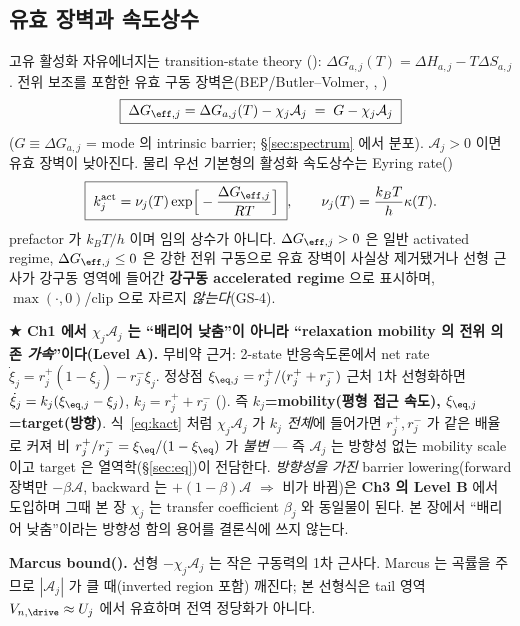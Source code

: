 \subsection{유효 장벽과 속도상수}
고유 활성화 자유에너지는 transition-state theory \cite{eyring1935,evanspolanyi1938}():
$\Delta G_{a,j}(T)=\Delta H_{a,j}-T\Delta S_{a,j}$. 전위 보조를 포함한 유효 구동 장벽은(BEP/Butler--Volmer,
, \cite{evanspolanyi1938,bardfaulkner})
\begin{equation}
\boxed{\;\Delta G_{\eff,j}=\Delta G_{a,j}(T)-\chi_j\mathcal A_j\;=\;G-\chi_j\mathcal A_j\;}
\label{eq:Geff}
\end{equation}
($G\equiv\Delta G_{a,j}$ = mode 의 intrinsic barrier; \S\ref{sec:spectrum} 에서 분포). $\mathcal A_j>0$
이면 유효 장벽이 낮아진다. 물리 우선 기본형의 활성화 속도상수는 Eyring rate()
\begin{equation}
\boxed{\;k_j^\mathrm{act}=\nu_j(T)\exp\!\Big[-\frac{\Delta G_{\eff,j}}{RT}\Big]\;},\qquad
\nu_j(T)=\frac{k_BT}{h}\kappa(T).
\label{eq:kact}
\end{equation}
prefactor 가 $k_BT/h$ 이며 임의 상수가 아니다. $\Delta G_{\eff,j}>0$ 은 일반 activated regime,
$\Delta G_{\eff,j}\le0$ 은 강한 전위 구동으로 유효 장벽이 사실상 제거됐거나 선형 근사가 강구동 영역에
들어간 \textbf{강구동 accelerated regime} 으로 표시하며, $\max(\cdot,0)$/clip 으로 자르지 \emph{않는다}(GS-4).

\begin{keybox}
\textbf{★ Ch1 에서 $\chi_j\mathcal A_j$ 는 ``배리어 낮춤''이 아니라 ``relaxation mobility 의 전위 의존
\emph{가속}''이다(Level A).} 무비약 근거: 2-state 반응속도론에서 net rate
$\dot\xi_j=r_j^+(1-\xi_j)-r_j^-\xi_j$. 정상점 $\xi_{\eq,j}=r_j^+/(r_j^++r_j^-)$ 근처 1차 선형화하면
$\dot\xi_j=k_j(\xi_{\eq,j}-\xi_j)$, $k_j=r_j^++r_j^-$ (). 즉 \textbf{$k_j$=mobility(평형 접근
속도), $\xi_{\eq,j}$=target(방향)}. 식~\eqref{eq:kact} 처럼 $\chi_j\mathcal A_j$ 가 \emph{$k_j$ 전체}에
들어가면 $r_j^+,r_j^-$ 가 같은 배율로 커져 비 $r_j^+/r_j^-=\xi_\eq/(1-\xi_\eq)$ 가 \emph{불변} — 즉
$\mathcal A_j$ 는 방향성 없는 mobility scale 이고 target 은 열역학(\S\ref{sec:eq})이 전담한다. \emph{방향성을
가진} barrier lowering(forward 장벽만 $-\beta\mathcal A$, backward 는 $+(1-\beta)\mathcal A$ $\Rightarrow$
비가 바뀜)은 \textbf{Ch3 의 Level B} 에서 도입하며 그때 본 장 $\chi_j$ 는 transfer coefficient $\beta_j$
와 동일물이 된다. 본 장에서 ``배리어 낮춤''이라는 방향성 함의 용어를 결론식에 쓰지 않는다.
\end{keybox}
\begin{boundbox}
\textbf{Marcus bound().} 선형 $-\chi_j\mathcal A_j$ 는 작은 구동력의 1차 근사다. Marcus
\cite{marcus1956} 는 곡률을 주므로 $|\mathcal A_j|$ 가 클 때(inverted region 포함) 깨진다; 본 선형식은
tail 영역 $V_{n,\drive}\approx U_j$ 에서 유효하며 전역 정당화가 아니다.
\end{boundbox}

